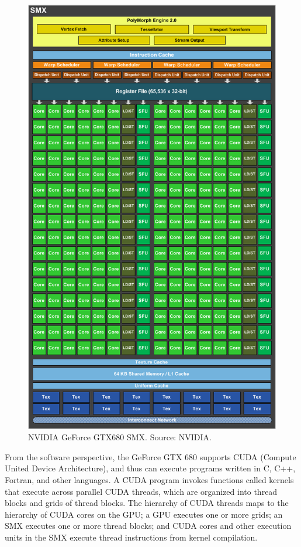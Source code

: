 \begin{figure}
\centering
\includegraphics[width=\textwidth]{GPU/GeForceGTX680SMX.png}
\caption{NVIDIA GeForce GTX680 SMX. Source: NVIDIA.}
\label{GPU:GeForceGTX680SMX}
\end{figure}

From the software perspective, the GeForce GTX 680 supports CUDA (Compute United Device Architecture), and thus can execute programs written in C, C++, Fortran, and other languages. A CUDA program invokes functions called kernels that execute across parallel CUDA threads, which are organized into thread blocks and grids of thread blocks. The hierarchy of CUDA threads maps to the hierarchy of CUDA cores on the GPU; a GPU executes one or more grids; an SMX executes one or more thread blocks; and CUDA cores and other execution units in the SMX execute thread instructions from kernel compilation.

